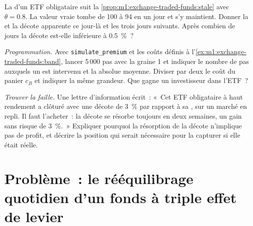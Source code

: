 \begin{exercise}[$\star\star$]\label{exo:m1:exchange-traded-funds:6}
La  d'un ETF obligataire suit la \cref{prop:m1:exchange-traded-funds:stale} avec
$\theta = 0.8$. La valeur vraie tombe de 100 à 94 en un jour et s'y maintient. Donner la
 et la décote apparente ce jour-là et
les trois jours suivants. Après combien de jours la décote est-elle inférieure à 0.5~\%~?
\end{exercise}

\begin{exercise}[$\star\star\star$]\label{exo:m1:exchange-traded-funds:7}
\emph{Programmation.} Avec \texttt{simulate\_premium} et les coûts définis
à l'\cref{ex:m1:exchange-traded-funds:band}, lancer 5\,000 pas avec la graine 1 et
indiquer le nombre de pas auxquels un  est intervenu et la
 absolue moyenne. Diviser par deux le coût du panier $c_B$ et indiquer la même grandeur. Que
gagne un investisseur dans l'ETF~?
\end{exercise}

\begin{exercise}[$\star\star\star$]\label{exo:m1:exchange-traded-funds:8}
\emph{Trouver la faille.} Une lettre d'information écrit~: «~Cet ETF obligataire à haut rendement a clôturé
avec une décote de 3~\% par rapport à sa , sur un marché en repli. Il faut l'acheter~: la décote
se résorbe toujours en deux semaines, un gain sans risque de 3~\%.~» Expliquer pourquoi la résorption
de la décote n'implique pas de profit, et décrire la position qui serait nécessaire pour
la capturer si elle était réelle.
\end{exercise}

\section{Problème~: le rééquilibrage quotidien d'un fonds à triple effet de levier}

